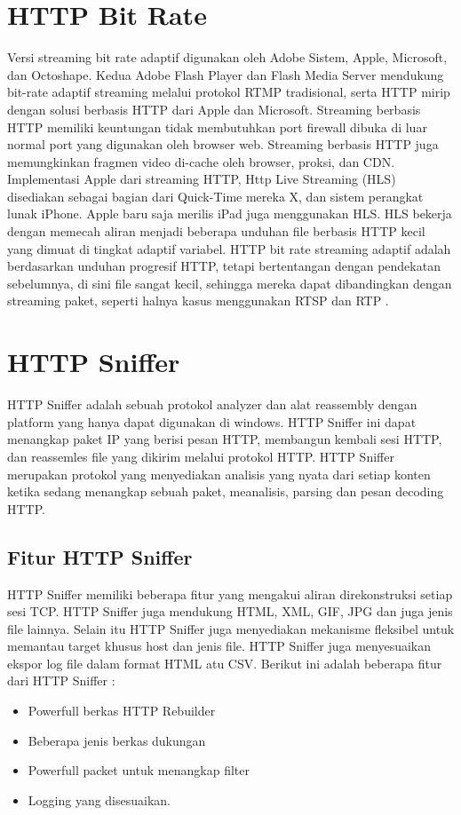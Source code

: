 \section{HTTP Bit Rate}
Versi streaming bit rate adaptif digunakan oleh Adobe Sistem, Apple, Microsoft, dan Octoshape. Kedua Adobe Flash Player dan Flash Media Server mendukung bit-rate adaptif streaming melalui protokol RTMP tradisional, serta HTTP mirip dengan solusi berbasis HTTP dari Apple dan Microsoft. Streaming berbasis HTTP memiliki keuntungan tidak membutuhkan port firewall dibuka di luar normal port yang digunakan oleh browser web. Streaming berbasis HTTP juga memungkinkan fragmen video di-cache oleh browser, proksi, dan CDN. Implementasi Apple dari streaming HTTP, Http Live Streaming (HLS) disediakan sebagai bagian dari Quick-Time mereka X, dan sistem perangkat lunak iPhone. Apple baru saja merilis iPad juga menggunakan HLS. HLS bekerja dengan memecah aliran menjadi beberapa unduhan file berbasis HTTP kecil yang dimuat di tingkat adaptif variabel. HTTP bit rate streaming adaptif adalah berdasarkan unduhan progresif HTTP, tetapi bertentangan dengan pendekatan sebelumnya, di sini file sangat kecil, sehingga mereka dapat dibandingkan dengan streaming paket, seperti halnya kasus menggunakan RTSP dan RTP
\cite{hsu2013startup}.

\section{HTTP Sniffer}
HTTP Sniffer adalah sebuah protokol analyzer dan alat reassembly dengan platform yang hanya dapat digunakan di windows. HTTP Sniffer ini dapat menangkap paket IP yang berisi pesan HTTP, membangun kembali sesi HTTP, dan reassemles file yang dikirim melalui protokol HTTP. HTTP Sniffer merupakan protokol yang menyediakan analisis yang nyata dari setiap konten ketika sedang menangkap sebuah paket, meanalisis, parsing dan pesan decoding HTTP\cite{sujana2015perangkat}.

\subsection{Fitur HTTP Sniffer}
HTTP Sniffer memiliki beberapa fitur yang mengakui aliran direkonstruksi setiap sesi TCP. HTTP Sniffer juga mendukung HTML, XML, GIF, JPG dan juga jenis file lainnya. Selain itu HTTP Sniffer juga menyediakan mekanisme fleksibel untuk memantau target khusus host dan jenis  file. HTTP Sniffer juga menyesuaikan ekspor log file dalam format HTML atu CSV.  Berikut ini adalah beberapa fitur dari HTTP Sniffer :
\begin{itemize}
\item Powerfull berkas HTTP Rebuilder
\item Beberapa jenis berkas dukungan
\item Powerfull packet untuk menangkap filter
\item Logging yang disesuaikan\cite{sujana2015perangkat}.
\end{itemize}

